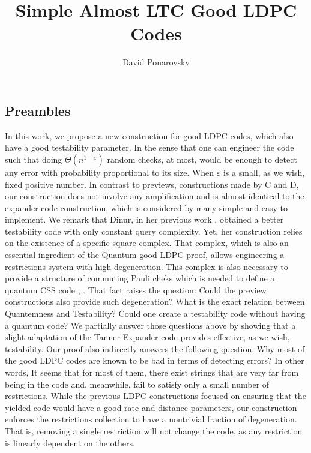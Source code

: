 \documentclass{article}
\begin{document}
\title{Simple Almost LTC Good LDPC Codes} 
\author{David Ponarovsky}
\maketitle
{} 
\begin{multicols*}{2}
  \section{Preambles}
  In this work, we propose a new construction for good LDPC codes, which also have a good testability parameter. In the sense that one can engineer the code such that doing $\Theta\left( n^{1-\varepsilon}\right)$ random checks, at most, would be enough to detect any error with probability proportional to its size. When $\varepsilon$ is a small, as we wish, fixed positive number.  In contrast to previews, constructions made by C and D, our construction does not involve any amplification and is almost identical to the expander code construction, which is considered by many simple and easy to implement. We remark that Dinur, in her previous work \cite{Dinur}, obtained a better testability code with only constant query complexity. 
  Yet, her construction relies on the existence of a specific square complex. That complex, which is also an essential ingredient of the Quantum good LDPC proof, allows engineering a restrictions system with high degeneration. This complex is also necessary to provide a structure of commuting Pauli cheks which is needed to define a quantum CSS code \cite{Pavel}, \cite{leverrier2022quantum}. That fact raises the question: Could the preview constructions also provide such degeneration? What is the exact relation between Quantemness and Testability? Could one create a testability code without having a quantum code? We partially answer those questions above by showing that a slight adaptation of the Tanner-Expander code provides effective, as we wish, testability.
Our proof also indirectly answers the following question. Why most of the good LDPC codes are known to be bad in terms of detecting errors? In other words, It seems that for most of them, there exist strings that are very far from being in the code and, meanwhile, fail to satisfy only a small number of restrictions.
While the previous LDPC constructions focused on ensuring that the yielded code would have a good rate and distance parameters, our construction enforces the restrictions collection to have a nontrivial fraction of degeneration. That is, removing a single restriction will not change the code, as any restriction is linearly dependent on the others.




\end{multicols*}
\end{document}
